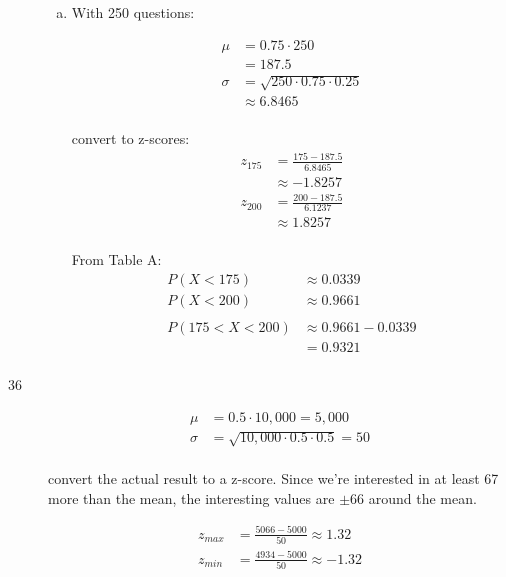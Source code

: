 \documentclass[letterpaper, landscape]{exam}
\begin{document}
\begin{description}
\begin{enumerate}[(a)]
          \item
            With 250 questions:

            \begin{align*}
              \mu    & = 0.75 \cdot 250 \\
                     & = 187.5 \\
              \sigma & = \sqrt{250 \cdot 0.75 \cdot 0.25} \\
                     & \approx 6.8465 \\
            \end{align*}

            convert to z-scores:
            \begin{align*}
              z_{175} & = \frac{175 - 187.5}{6.8465} \\
                      & \approx -1.8257 \\
              z_{200} & = \frac{200 - 187.5}{6.1237} \\
                      & \approx 1.8257 \\
            \end{align*}

            From Table A:
            \begin{align*}
              P(X < 175) & \approx 0.0339 \\
              P(X < 200) & \approx 0.9661 \\
              \\
              P(175 < X < 200) & \approx 0.9661 - 0.0339 \\
                               & = \boxed{ 0.9321 } \\
            \end{align*}
        
        \end{enumerate}

      \item[36]
        \begin{align*}
          \mu    & = 0.5 \cdot 10,000 = 5,000 \\
          \sigma & = \sqrt{10,000 \cdot 0.5 \cdot 0.5} = 50 \\
        \end{align*}

        convert the actual result to a z-score. Since we're interested in at
        least 67 more than the mean, the interesting values are $\pm 66$ around
        the mean.

        \begin{align*}
          z_{max} &= \frac{5066 - 5000}{50} \approx 1.32 \\
          z_{min} &= \frac{4934 - 5000}{50} \approx -1.32 \\
        \end{align*}


\end{description}
\end{document}
